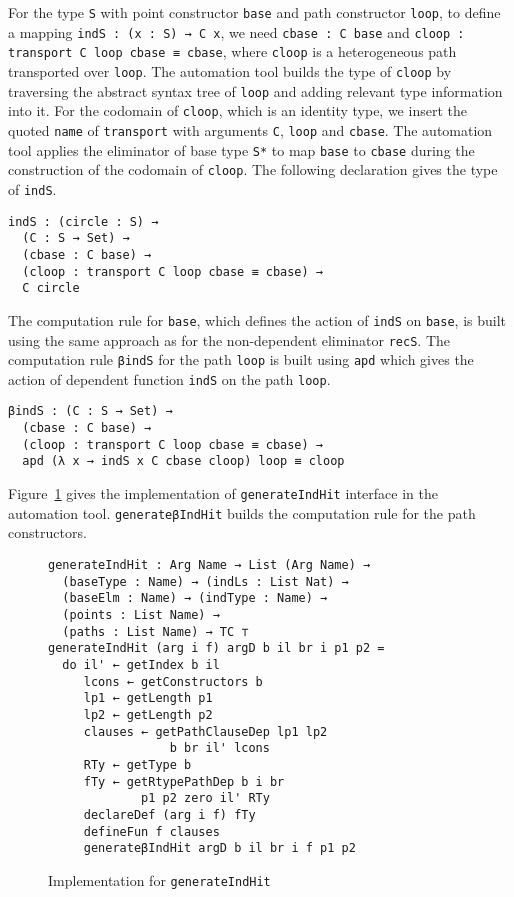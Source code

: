 \documentclass[sigplan,10pt]{acmart}
\begin{document}
For the type {\tt S} with point constructor {\tt base} and path constructor {\tt loop}, to define a mapping {\tt indS : (x : S) → C x}, we need {\tt cbase : C base} and {\tt cloop : transport C loop cbase ≡ cbase}, where {\tt cloop} is a heterogeneous path transported over {\tt loop}. The automation tool builds the type of {\tt cloop} by traversing the abstract syntax tree of {\tt loop} and adding relevant type information into it. For the codomain of {\tt cloop}, which is an identity type, we insert the quoted {\tt name} of {\tt transport} with arguments {\tt C}, {\tt loop} and {\tt cbase}. The automation tool applies the eliminator of base type {\tt S*} to map {\tt base} to {\tt cbase} during the construction of the codomain of {\tt cloop}. The following declaration gives the type of {\tt indS}.
\begin{center}
\begin{BVerbatim}
indS : (circle : S) → 
  (C : S → Set) →
  (cbase : C base) →
  (cloop : transport C loop cbase ≡ cbase) →
  C circle
\end{BVerbatim}
\end{center}

The computation rule for {\tt base}, which defines the action of {\tt indS} on {\tt base}, is built using the same approach as for the non-dependent eliminator {\tt recS}. The computation rule {\tt βindS} for the path {\tt loop} is built using {\tt apd} which gives the action of dependent function {\tt indS} on the path {\tt loop}.
\begin{center}
\begin{BVerbatim}
βindS : (C : S → Set) → 
  (cbase : C base) → 
  (cloop : transport C loop cbase ≡ cbase) → 
  apd (λ x → indS x C cbase cloop) loop ≡ cloop
\end{BVerbatim}
\end{center}

Figure~\ref{fig:generateIndHit} gives the implementation of {\tt generateIndHit} interface in the automation tool. {\tt generateβIndHit} builds the computation rule for the path constructors.

\begin{figure}
\begin{center}
\begin{Verbatim}
generateIndHit : Arg Name → List (Arg Name) →
  (baseType : Name) → (indLs : List Nat) →
  (baseElm : Name) → (indType : Name) →
  (points : List Name) → 
  (paths : List Name) → TC ⊤
generateIndHit (arg i f) argD b il br i p1 p2 =
  do il' ← getIndex b il
     lcons ← getConstructors b
     lp1 ← getLength p1
     lp2 ← getLength p2
     clauses ← getPathClauseDep lp1 lp2
                 b br il' lcons
     RTy ← getType b
     fTy ← getRtypePathDep b i br
             p1 p2 zero il' RTy
     declareDef (arg i f) fTy
     defineFun f clauses
     generateβIndHit argD b il br i f p1 p2
\end{Verbatim}
\end{center}
\caption{Implementation for {\tt generateIndHit}}
\label{fig:generateIndHit}
\end{figure}
\normalsize
\end{document}
